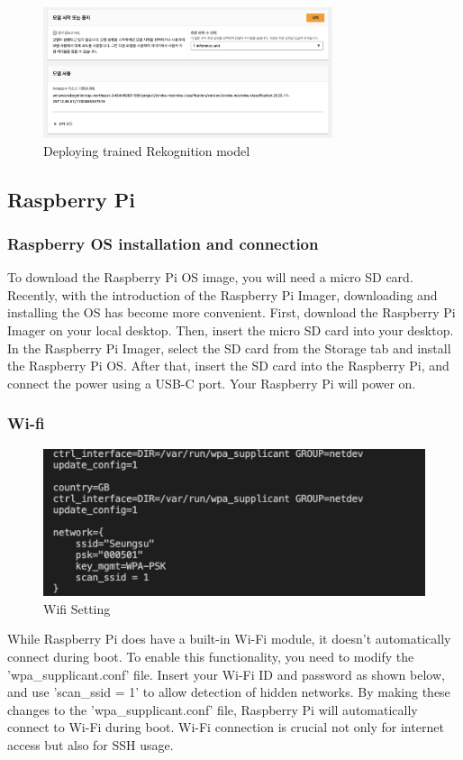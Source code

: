 \begin{figure}[h!]
    \centering
    \includegraphics[width=8.5cm]{images/rek_deploy.png}
    \caption{Deploying trained Rekognition model}
\end{figure}



\subsection{\textbf{Raspberry Pi}}

\subsubsection{\textbf{Raspberry OS installation and connection}}
To download the Raspberry Pi OS image, you will need a micro SD card. Recently, with the introduction of the Raspberry Pi Imager, downloading and installing the OS has become more convenient.
First, download the Raspberry Pi Imager on your local desktop. Then, insert the micro SD card into your desktop. In the Raspberry Pi Imager, select the SD card from the Storage tab and install the Raspberry Pi OS.
After that, insert the SD card into the Raspberry Pi, and connect the power using a USB-C port. Your Raspberry Pi will power on.\\

\subsubsection{\textbf{Wi-fi}}
\begin{figure}[h]
    \centering
    \includegraphics[width=1\linewidth]{images/wifi.png}
    \caption{Wifi Setting}
    \label{fig:enter-label}
\end{figure}
While Raspberry Pi does have a built-in Wi-Fi module, it doesn't automatically connect during boot. To enable this functionality, you need to modify the 'wpa\_supplicant.conf' file. Insert your Wi-Fi ID and password as shown below, and use 'scan\_ssid = 1' to allow detection of hidden networks. By making these changes to the 'wpa\_supplicant.conf' file, Raspberry Pi will automatically connect to Wi-Fi during boot. Wi-Fi connection is crucial not only for internet access but also for SSH usage.\\


